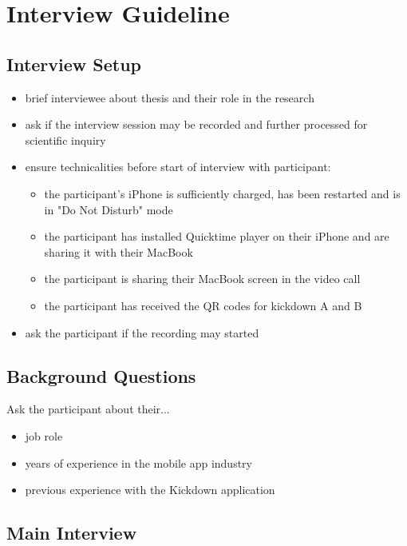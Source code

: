 \appendix

\chapter{Interview Guideline} \label{section::interview_guideline}
\section{Interview Setup}
\begin{itemize}
    \item brief interviewee about thesis and their role in the research
    \item ask if the interview session may be recorded and further processed for scientific inquiry
    \item ensure technicalities before start of interview with participant:
    \begin{itemize}
        \item the participant's iPhone is sufficiently charged, has been restarted and is in "Do Not Disturb" mode
        \item the participant has installed Quicktime player on their iPhone and are sharing it with their MacBook
        \item the participant is sharing their MacBook screen in the video call
        \item the participant has received the QR codes for kickdown A and B
    \end{itemize}
    \item ask the participant if the recording may started
\end{itemize}

\section{Background Questions}
Ask the participant about their...
\begin{itemize}
    \item job role
    \item years of experience in the mobile app industry
    \item previous experience with the Kickdown application
\end{itemize}

\section{Main Interview}
